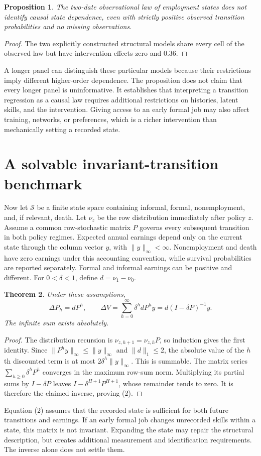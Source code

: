 \documentclass[11pt,a4paper]{article}
\newtheorem{theorem}{Theorem}[section]
\newtheorem{proposition}[theorem]{Proposition}
\begin{document}
\begin{proposition}
The two-date observational law of employment states does not identify causal
state dependence, even with strictly positive observed transition probabilities
and no missing observations.
\end{proposition}
\begin{proof}
The two explicitly constructed structural models share every cell of the
observed law but have intervention effects zero and $0.36$.
\end{proof}
A longer panel can distinguish these particular models because their
restrictions imply different higher-order dependence. The proposition does
not claim that every longer panel is uninformative. It establishes that
interpreting a transition regression as a causal law requires additional
restrictions on histories, latent skills, and the intervention. Giving access
to an early formal job may also affect training, networks, or preferences,
which is a richer intervention than mechanically setting a recorded state.

\section{A solvable invariant-transition benchmark}
Now let $\mathcal S$ be a finite state space containing informal, formal,
nonemployment, and, if relevant, death. Let $\nu_z$ be the row distribution
immediately after policy $z$. Assume a common row-stochastic matrix $P$
governs every subsequent transition in both policy regimes. Expected annual
earnings depend only on the current state through the column vector $y$,
with $\|y\|_\infty<\infty$. Nonemployment and death have zero earnings under
this accounting convention, while survival probabilities are reported
separately. Formal and informal earnings can be positive and different.
For $0<\delta<1$, define $d=\nu_1-\nu_0$.

\begin{theorem}
Under these assumptions,
\[
 \Delta P_h=dP^h,\qquad
 \Delta V=\sum_{h=0}^\infty\delta^h dP^h y
                =d(I-\delta P)^{-1}y.                       \tag{2}
\]
The infinite sum exists absolutely.
\end{theorem}
\begin{proof}
The distribution recursion is $\nu_{z,h+1}=\nu_{z,h}P$, so induction gives
the first identity. Since $\|P^hy\|_\infty\leq\|y\|_\infty$ and
$\|d\|_1\leq2$, the absolute value of the $h$th discounted term is at most
$2\delta^h\|y\|_\infty$. This is summable. The matrix series
$\sum_{h\geq0}\delta^hP^h$ converges in the maximum row-sum norm.
Multiplying its partial sums by $I-\delta P$ leaves
$I-\delta^{H+1}P^{H+1}$, whose remainder tends to zero. It is therefore the
claimed inverse, proving (2).
\end{proof}
Equation (2) assumes that the recorded state is sufficient for both future
transitions and earnings. If an early formal job changes unrecorded skills
within a state, this matrix is not invariant. Expanding the state may repair
the structural description, but creates additional measurement and
identification requirements. The inverse alone does not settle them.
\end{document}
